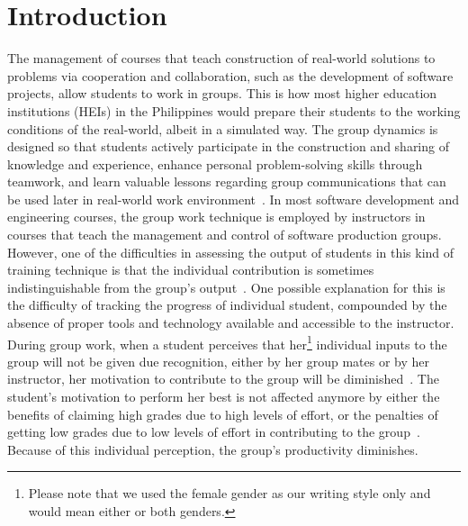 \documentclass[a4paper,a4paper,BCOR12mm,12pt,abstracton,pointednumbers,tablecaptionabove,footinclude,halfparskip,normalheadings,]{scrartcl}
\begin{document}
\section{Introduction}
The management of courses that teach construction of real-world solutions to problems via cooperation and collaboration, such as the development of software projects, allow students to work in groups. This is how most higher education institutions (HEIs) in the Philippines would prepare their students to the working conditions of the real-world, albeit in a simulated way. The group dynamics is designed so that students actively participate in the construction and sharing of knowledge and experience, enhance personal problem-solving skills through teamwork, and learn valuable lessons regarding group communications that can be used later in real-world work environment~\citep{Becker98, Black02, Haythornthwaite06}. In most software development and engineering courses, the group work technique is employed by instructors in courses that teach the management and control of software production groups. However, one of the difficulties in assessing the output of students in this kind of training technique is that the individual contribution is sometimes indistinguishable from the group's output~\citep{Williams81}. One possible explanation for this is the difficulty of tracking the progress of individual student, compounded by the absence of proper tools and technology available and accessible to the instructor. During group work, when a student perceives that her\footnote{Please note that we used the female gender as our writing style only and would mean either or both genders.} individual inputs to the group will not be given due recognition, either by her group mates or by her instructor, her motivation to contribute to the group will be diminished~\citep{Jones84}. The student's motivation to perform her best is not affected anymore by either the benefits of claiming high grades due to high levels of effort, or the penalties of getting low grades due to low levels of effort in contributing to the group~\citep{Jones84}. Because of this individual perception, the group's productivity diminishes. 
\end{document}
